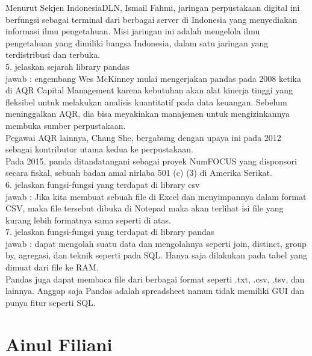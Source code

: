 \begin{enumerate}
Menurut Sekjen IndonesiaDLN,  Ismail Fahmi, jaringan perpustakaan digital ini berfungsi sebagai terminal dari berbagai server di Indonesia yang menyediakan informasi ilmu pengetahuan. Misi jaringan ini adalah mengelola ilmu pengetahuan yang dimiliki bangsa Indonesia, dalam satu jaringan yang terdistribusi dan terbuka.\\

5. jelaskan sejarah library pandas\\
jawab : engembang Wes McKinney mulai mengerjakan pandas pada 2008 ketika di AQR Capital Management karena kebutuhan akan alat kinerja tinggi yang fleksibel untuk melakukan analisis kuantitatif pada data keuangan. Sebelum meninggalkan AQR, dia bisa meyakinkan manajemen untuk mengizinkannya membuka sumber perpustakaan.\\

Pegawai AQR lainnya, Chang She, bergabung dengan upaya ini pada 2012 sebagai kontributor utama kedua ke perpustakaan.\\

Pada 2015, panda ditandatangani sebagai proyek NumFOCUS yang disponsori secara fiskal, sebuah badan amal nirlaba 501 (c) (3) di Amerika Serikat.\\

6. jelaskan fungsi-fungsi yang terdapat di library csv\\
jawab : Jika kita membuat sebuah file di Excel dan menyimpannya dalam format CSV, maka file tersebut dibuka di Notepad maka akan terlihat isi file yang kurang lebih formatnya sama seperti di atas.\\

7. jelaskan fungsi-fungsi yang terdapat di library pandas\\
jawab : dapat mengolah suatu data dan mengolahnya seperti join, distinct, group by, agregasi, dan teknik seperti pada SQL. Hanya saja dilakukan pada tabel yang dimuat dari file ke RAM.\\

Pandas juga dapat membaca file dari berbagai format seperti .txt, .csv, .tsv, dan lainnya. Anggap saja Pandas adalah spreadsheet namun tidak memiliki GUI dan punya fitur seperti SQL.\\

\section{Ainul Filiani}
\begin{enumerate}



\end{enumerate}
\end{enumerate}
